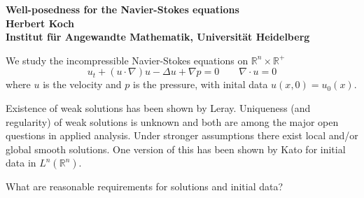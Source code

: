 \documentclass[a4paper,12pt]{amsart}
\begin{document}
\def\R{{\mathbb R}}
\def\Z{{\mathbb Z}}
\def\X{X}
\def\Y{Y}
\def\qn{{Q^n}}  
\def\qn1{{Q^{n+1}}}
\def\d{\partial}
\def\e{\epsilon}
\def\aa{\alpha}
\def\tt{\theta}
\def\VMO{\overline{VMO}}
\def\F{\mathcal{F}}

\newtheorem{theorem}{Theorem}

\theoremstyle{remark}
\newtheorem{remark}{Remark}
\newtheorem{definition}[remark]{Definition}

\newcommand{\baa}{\begin{eqnarray}}
\newcommand{\eaa}{\end{eqnarray}}
\newcommand{\ba}{\begin{array}}
\newcommand{\ea}{\end{array}}
\newcommand{\bas}{\begin{eqnarray*}}
\newcommand{\eas}{\end{eqnarray*}}

 

\begin{center}
{\bf Well-posedness for the Navier-Stokes equations\\
Herbert Koch \\ 
Institut f\"ur Angewandte Mathematik, Universit\"at Heidelberg
}
\end{center}






We study the incompressible Navier-Stokes equations on $\R^n \times
\R^+$
\begin{equation} \label{nav} 
u_t + (u \cdot \nabla ) u-\Delta u + \nabla p  =0 
\qquad 
\nabla \cdot u = 0
\end{equation}
where $u$ is the velocity and $p$ is the pressure, with inital data 
$u(x,0)= u_0(x)$.


Existence of weak solutions has been shown by Leray. Uniqueness (and regularity) of weak solutions is unknown and both are among 
the major open questions in applied analysis.
Under stronger assumptions there exist local and/or global smooth solutions.
One version of this has been shown by Kato for initial data in $L^n(\R^n)$.



What are reasonable requirements for solutions and initial data?
\end{document}
